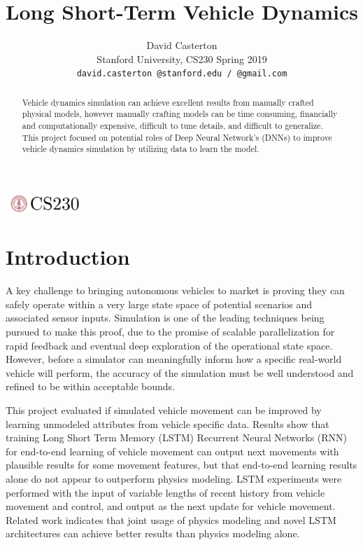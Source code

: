 \documentclass{article}
\title{Long Short-Term Vehicle Dynamics}
\author{
  David Casterton\\
  Stanford University, CS230 Spring 2019\\
  \texttt{david.casterton @stanford.edu / @gmail.com} \\
}
\begin{document}
\begin{center}
\includegraphics[width=3cm, height=0.7cm]{CS230}
\end{center}

\maketitle

\begin{abstract}
Vehicle dynamics simulation can achieve excellent results from manually crafted physical models, however manually crafting models can be time consuming, financially and computationally expensive, difficult to tune details, and difficult to generalize. This project focused on potential roles of Deep Neural Network's (DNNs) to improve vehicle dynamics simulation by utilizing data to learn the model.
\end{abstract}

\section{Introduction}	
A key challenge to bringing autonomous vehicles to market is proving they can safely operate within a very large state space of potential scenarios and associated sensor inputs. Simulation is one of the leading techniques being pursued to make this proof, due to the promise of scalable parallelization for rapid feedback and eventual deep exploration of the operational state space. However, before a simulator can meaningfully inform how a specific real-world vehicle will perform, the accuracy of the simulation must be well understood and refined to be within acceptable bounds.

This project evaluated if simulated vehicle movement can be improved by learning unmodeled attributes from vehicle specific data. Results show that training Long Short Term Memory (LSTM) Recurrent Neural Networks (RNN) for end-to-end learning of vehicle movement can output next movements with plausible results for some movement features, but that end-to-end learning results alone do not appear to outperform physics modeling. LSTM experiments were performed with the input of variable lengths of recent history from vehicle movement and control, and output as the next update for vehicle movement. Related work indicates that joint usage of physics modeling and novel LSTM architectures can achieve better results than physics modeling alone.
\end{document}
